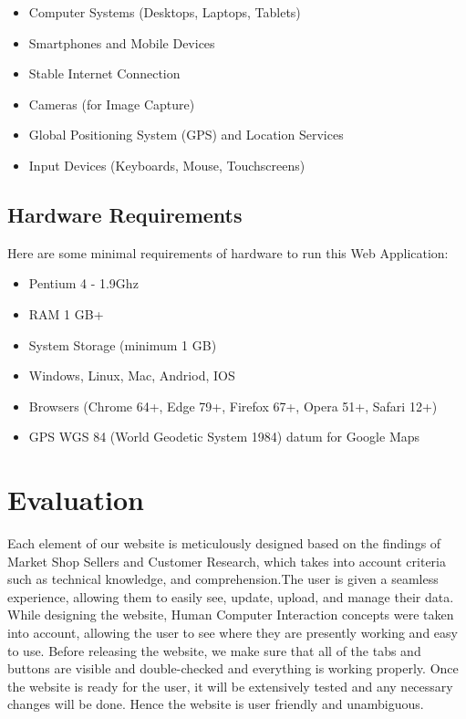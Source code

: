 \begin{itemize}
	\item Computer Systems (Desktops, Laptops, Tablets)
	\item Smartphones and Mobile Devices
	\item Stable Internet Connection
	\item Cameras (for Image Capture)
	\item Global Positioning System (GPS) and Location Services
	\item Input Devices (Keyboards, Mouse, Touchscreens)
\end{itemize}

\subsection{Hardware Requirements}
Here are some minimal requirements of hardware to run this Web Application:
\begin{itemize}
	\item Pentium 4 - 1.9Ghz  
	\item RAM 1 GB+ 
	\item System Storage (minimum 1 GB)
	\item Windows, Linux, Mac, Andriod, IOS
	\item Browsers (Chrome 64+, Edge 79+, Firefox 67+, Opera 51+, Safari 12+)
	\item GPS WGS 84 (World Geodetic System 1984) datum for Google Maps 
\end{itemize}


\section{Evaluation}
Each element of our website is meticulously designed based on the findings of Market Shop Sellers and Customer Research, which takes into account criteria such as technical knowledge, and comprehension.The user is given a seamless experience, allowing them to easily see, update, upload, and manage their data. While designing the website, Human Computer Interaction concepts were taken into account, allowing the user to see where they are presently working and easy to use. Before releasing the website, we make sure that all of the tabs and buttons are visible and double-checked and everything is working properly. Once the website is ready for the user, it will be extensively tested and any necessary changes will be done. Hence the website is user friendly and unambiguous.

